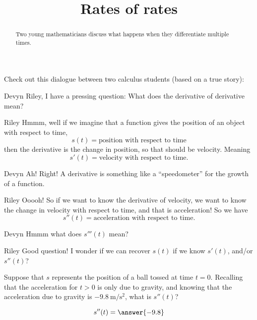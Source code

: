 \documentclass{ximera}
\title[Break-Ground:]{Rates of rates}
\begin{document}
\begin{abstract}
Two young mathematicians discuss what happens when they differentiate
multiple times.
\end{abstract}
\maketitle

Check out this dialogue between two calculus students (based on a true
story):

\begin{dialogue}
  \item[Devyn] Riley, I have a pressing question: What does the
    derivative of derivative mean?
  \item[Riley] Hmmm, well if we imagine that a function gives the
    position of an object with respect to time,
    \[
    s(t) = \text{position with respect to time}
    \]
    then the derivative is the change in position, so that should be
    velocity. Meaning
    \[
    s'(t) = \text{velocity with respect to time}.
    \]
  \item[Devyn] Ah! Right! A derivative is something like a
    ``speedometer'' for the growth of a function.
  \item[Riley] Ooooh! So if we want to know the derivative of
    velocity, we want to know the change in velocity with respect to
    time, and that is acceleration! So we have
    \[
    s''(t) = \text{acceleration with respect to time}.
    \]
  \item[Devyn] Hmmm what does $s'''(t)$ mean?
    \item[Riley] Good question! I wonder if we can recover $s(t)$ if
      we know $s'(t)$, and/or $s''(t)$?
\end{dialogue}

\begin{problem}
  Suppose that $s$ represents the position of a ball tossed at time
  $t=0$. Recalling that the acceleration for $t>0$ is only due to
  gravity, and knowing that the acceleration due to gravity is
  $-9.8~\mathrm{m}/\mathrm{s}^2$, what is $s''(t)$?
  \begin{prompt}
  \[
  s''(t) = \answer{-9.8}
  \]
  \end{prompt}
\end{problem}



\end{document}
